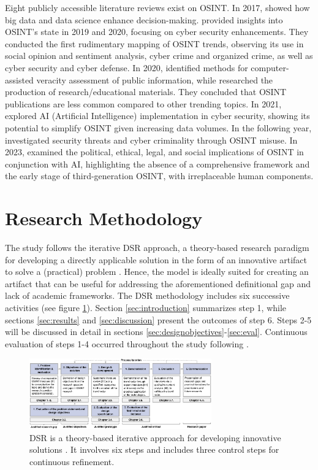 \documentclass[10pt]{article}
\begin{document}
Eight publicly accessible literature reviews exist on OSINT. In 2017, \cite{DosPassos.2017} showed how big data and data science enhance decision-making. \cite{PastorGalindo.2019, PastorGalindo.2020}
provided insights into OSINT's state in 2019 and 2020, focusing on cyber security
enhancements. They conducted the first rudimentary mapping of OSINT trends, observing its use in social opinion and sentiment
analysis, cyber crime and organized crime, as well as cyber security and cyber defense. In 2020, \cite{GarciaLozano.2020} identified methods for computer-assisted veracity assessment of public information, while
\cite{HerreraCubides.2020} researched the production of research/educational materials. They concluded that OSINT
publications are less common compared to other trending topics. In 2021, \cite{Yogish.2021} explored AI (Artificial Intelligence) implementation in cyber security,
showing its potential to simplify OSINT given increasing data volumes. In the following year,
\cite{Hwang.2022} investigated security threats and cyber criminality through OSINT misuse.
In 2023, \cite{Ghioni.2023} examined the political, ethical, legal, and social implications of
OSINT in conjunction with AI, highlighting the absence of a comprehensive framework and the early stage of third-generation OSINT, with irreplaceable human components.

\section{Research Methodology}

The study follows the iterative DSR approach, a theory-based research paradigm for developing a directly applicable solution in the form of an innovative artifact \cite{vomBrocke.2020b}
to solve a (practical) problem \cite{Peffers.2007}. Hence, the model is ideally suited for creating an artifact that can be useful for addressing the aforementioned definitional gap and lack of academic frameworks. The DSR methodology includes
six successive activities \cite{Peffers.2007} (see figure \ref{fig: DSRM}). Section \ref{sec:introduction} summarizes step 1, while sections \ref{sec:results} and \ref{sec:discussion} present the outcomes of step 6. Steps 2-5 will be discussed in detail in sections \ref{sec:designobjectives}-\ref{sec:eval}. Continuous evaluation of steps 1-4 occurred throughout the study following \cite{Sonnenberg.2012}.

\begin{figure}[thb]
    \centering
    \includegraphics[width=0.7\textwidth]{PDF/images/cropped DSR_V01.pdf}
    \caption{DSR is a theory-based iterative approach for developing innovative solutions \cite{Peffers.2007}. It involves six steps \cite{Peffers.2007} and includes three control steps \cite{Sonnenberg.2012} for continuous refinement.}
    \label{fig: DSRM}
\end{figure}
\end{document}

